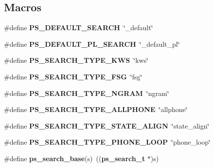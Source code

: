 \subsection*{Macros}
\begin{DoxyCompactItemize}
\item 
\#define {\bfseries P\+S\+\_\+\+D\+E\+F\+A\+U\+L\+T\+\_\+\+S\+E\+A\+R\+C\+H}~\char`\"{}\+\_\+default\char`\"{}\label{pocketsphinx__internal_8h_a84a97dd05f15264c6949498feb139671}

\item 
\#define {\bfseries P\+S\+\_\+\+D\+E\+F\+A\+U\+L\+T\+\_\+\+P\+L\+\_\+\+S\+E\+A\+R\+C\+H}~\char`\"{}\+\_\+default\+\_\+pl\char`\"{}\label{pocketsphinx__internal_8h_a1a7406bb1a164a4428493880ed92f786}

\item 
\#define {\bfseries P\+S\+\_\+\+S\+E\+A\+R\+C\+H\+\_\+\+T\+Y\+P\+E\+\_\+\+K\+W\+S}~\char`\"{}kws\char`\"{}\label{pocketsphinx__internal_8h_adfbaef1de8cda36836738d8abb894a1f}

\item 
\#define {\bfseries P\+S\+\_\+\+S\+E\+A\+R\+C\+H\+\_\+\+T\+Y\+P\+E\+\_\+\+F\+S\+G}~\char`\"{}fsg\char`\"{}\label{pocketsphinx__internal_8h_a76b0af36a87ec087673e6a512848ea70}

\item 
\#define {\bfseries P\+S\+\_\+\+S\+E\+A\+R\+C\+H\+\_\+\+T\+Y\+P\+E\+\_\+\+N\+G\+R\+A\+M}~\char`\"{}ngram\char`\"{}\label{pocketsphinx__internal_8h_ab9a7015925f8a6a4e5a7230c2a91c4f7}

\item 
\#define {\bfseries P\+S\+\_\+\+S\+E\+A\+R\+C\+H\+\_\+\+T\+Y\+P\+E\+\_\+\+A\+L\+L\+P\+H\+O\+N\+E}~\char`\"{}allphone\char`\"{}\label{pocketsphinx__internal_8h_a108d71ca2ec794ec4cf4d7c99f63473d}

\item 
\#define {\bfseries P\+S\+\_\+\+S\+E\+A\+R\+C\+H\+\_\+\+T\+Y\+P\+E\+\_\+\+S\+T\+A\+T\+E\+\_\+\+A\+L\+I\+G\+N}~\char`\"{}state\+\_\+align\char`\"{}\label{pocketsphinx__internal_8h_a3bb128d00e94eb1b227c3a294dd1ce60}

\item 
\#define {\bfseries P\+S\+\_\+\+S\+E\+A\+R\+C\+H\+\_\+\+T\+Y\+P\+E\+\_\+\+P\+H\+O\+N\+E\+\_\+\+L\+O\+O\+P}~\char`\"{}phone\+\_\+loop\char`\"{}\label{pocketsphinx__internal_8h_a101df5cf65a6ad28766a30c63f2f2746}

\item 
\#define {\bfseries ps\+\_\+search\+\_\+base}(s)~(({\bf ps\+\_\+search\+\_\+t} $\ast$)s)\label{pocketsphinx__internal_8h_a27058b099b21336e1fd50299f8596171}


\end{DoxyCompactItemize}
